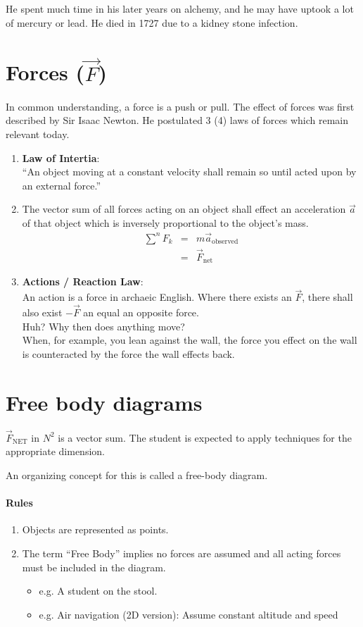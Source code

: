 \documentclass[letterpaper, 12pt]{article}
\begin{document}
He spent much time in his later years on alchemy, and he may have uptook a lot
of mercury or lead. He died in 1727 due to a kidney stone infection.

\section{Forces ($\vec{F}$)}
In common understanding, a force is a push or pull. The effect of forces was
first described by Sir Isaac Newton. He postulated 3 (4) laws of forces which
remain relevant today.
\begin{enumerate}
    \item \textbf{Law of Intertia}:\\
    ``An object moving at a constant velocity shall remain so until acted
    upon by an external force.''
    \item The vector sum of all forces acting on an object shall
    effect an acceleration $\vec{a}$ of that object which is inversely
    proportional to the object's mass.
    \[
        \begin{array}{lrl}
        \sum^n{F_k} & = & m\vec{a}_\textrm{observed}\\    
        & = & \vec{F}_\textrm{net}
        \end{array}
    \]
    \item \textbf{Actions / Reaction Law}:\\
    An action is a force in archaeic English. Where there exists an $\vec{F}$,
    there shall also exist $-\vec{F}$ an equal an opposite force.\\
    Huh? Why then does anything move?\\
    When, for example, you lean against the wall, the force you effect
    on the wall is counteracted by the force the wall effects back.
    
\end{enumerate}
\section{Free body diagrams}
$\vec{F}_\textrm{NET}$ in $N^2$ is a vector sum. The student is expected to apply
techniques for the appropriate dimension.

An organizing concept for this is called a free-body diagram.
\paragraph*{Rules}
\begin{enumerate}
    \item Objects are represented as points.
    \item The term ``Free Body'' implies no forces are assumed and all acting
    forces must be included in the diagram.
    \begin{itemize}
        \item e.g. A student on the stool.
        \item e.g. Air navigation (2D version): Assume constant altitude and speed
    \end{itemize}
\end{enumerate}
\end{document}
